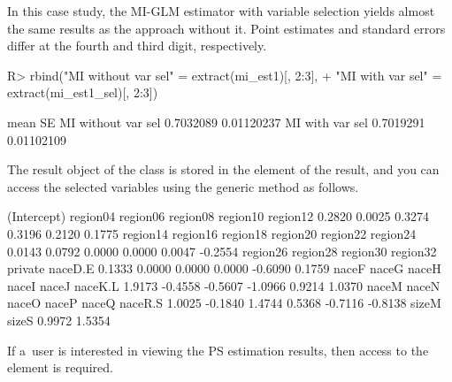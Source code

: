\documentclass[
]{jss}
\begin{document}
In this case study, the MI-GLM estimator with variable selection yields
almost the same results as the approach without it. Point estimates and
standard errors differ at the fourth and third digit, respectively.

\begin{CodeChunk}
\begin{CodeInput}
R> rbind("MI without var sel" = extract(mi_est1)[, 2:3],
+       "MI with var sel"    = extract(mi_est1_sel)[, 2:3])
\end{CodeInput}
\begin{CodeOutput}
                        mean         SE
MI without var sel 0.7032089 0.01120237
MI with var sel    0.7019291 0.01102109
\end{CodeOutput}
\end{CodeChunk}

The result object of the  class is stored in the
 element of the result, and you can access the selected
variables using the  generic method as follows.

\begin{CodeChunk}
\begin{CodeOutput}
(Intercept)    region04    region06    region08    region10    region12 
     0.2820      0.0025      0.3274      0.3196      0.2120      0.1775 
   region14    region16    region18    region20    region22    region24 
     0.0143      0.0792      0.0000      0.0000      0.0047     -0.2554 
   region26    region28    region30    region32     private     naceD.E 
     0.1333      0.0000      0.0000      0.0000     -0.6090      0.1759 
      naceF       naceG       naceH       naceI       naceJ     naceK.L 
     1.9173     -0.4558     -0.5607     -1.0966      0.9214      1.0370 
      naceM       naceN       naceO       naceP       naceQ     naceR.S 
     1.0025     -0.1840      1.4744      0.5368     -0.7116     -0.8138 
      sizeM       sizeS 
     0.9972      1.5354 
\end{CodeOutput}
\end{CodeChunk}

If a~user is interested in viewing the PS estimation results, then
access to the  element is required.
\end{document}
